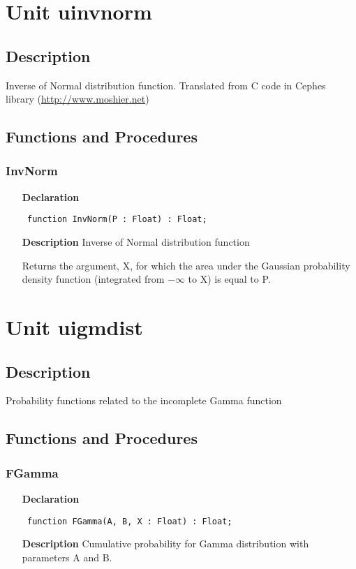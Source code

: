 \documentclass[12pt,a4paper,oneside]{report}
\newcommand{\declarationitem}[1]{\textbf{#1}}
\newcommand{\descriptiontitle}[1]{\textbf{#1}}
\newcommand{\code}[1]{\texttt{#1}}
\begin{document}
\section{Unit uinvnorm}
\label{uinvnorm}
\subsection{Description}
Inverse of Normal distribution function. 
Translated from C code in Cephes library (\href{http://www.moshier.net}{http://www.moshier.net}) \subsection{Functions and Procedures}
\subsubsection{InvNorm}
\label{uinvnorm-InvNorm}
\begin{itemize}\item[\declarationitem{Declaration}\hfill]
	\begin{flushleft}
		\code{
			function InvNorm(P : Float) : Float;}
	\end{flushleft}
	\item[\descriptiontitle{Description}]
	Inverse of Normal distribution function
	
	Returns the argument, X, for which the area under the Gaussian probability density function (integrated from $-\infty$ to X) is equal to P.
\end{itemize}
\section{Unit uigmdist}
\label{uigmdist}
\subsection{Description}
Probability functions related to the incomplete Gamma function 
\subsection{Functions and Procedures}
\subsubsection{FGamma}
\label{uigmdist-FGamma}
\begin{itemize}\item[\declarationitem{Declaration}\hfill]
	\begin{flushleft}
		\code{
			function FGamma(A, B, X : Float) : Float;}
	\end{flushleft}
	\item[\descriptiontitle{Description}]
	Cumulative probability for Gamma distribution with parameters A and B.
\end{itemize}
\end{document}
